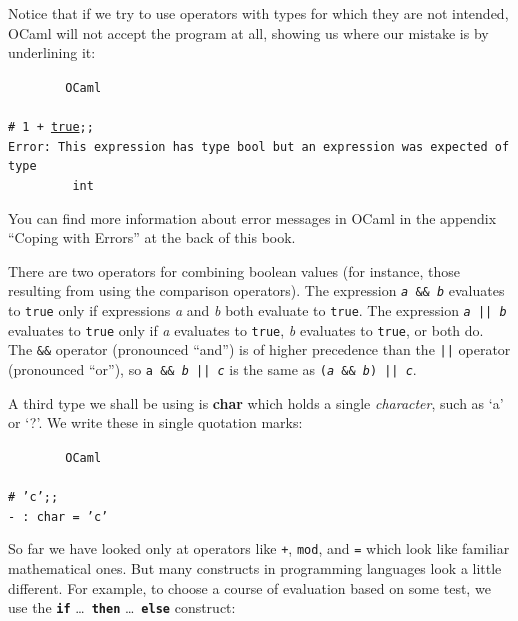 \documentclass[]{book}
\newcommand{\smspace}{\vspace{4mm}}
\begin{document}
\noindent Notice that if we try to use operators with types for which they are not intended, OCaml will not accept the program at all, showing us where our mistake is by underlining it:

\smspace
\noindent\verb!        OCaml!\\
\noindent\\
\noindent\texttt{\# 1 + }\underline{\verb!true!}\texttt{;;}\\
\noindent\texttt{Error:\ This expression has type bool but an expression was expected of type}\\
\noindent\verb!         int!
\smspace

\noindent You can find more information about error messages in OCaml in the appendix ``Coping with Errors'' at the back of this book.

\newcommand{\doublebar}{||}

There are two operators for combining boolean values (for instance, those resulting from using the comparison operators). The expression \texttt{\textit{\textrm{a}} \&\& \textit{\textrm{b}}} evaluates to \texttt{true} only if expressions \textit{a} and \textit{b} both evaluate to \texttt{true}. The expression \index{\doublebar@\texttt{\doublebar}}\texttt{\textit{\textrm{a}} || \textit{\textrm{b}}} evaluates to \texttt{true} only if \textit{a} evaluates to \texttt{true}, \textit{b} evaluates to \texttt{true}, or both do. The \texttt{\&\&} operator  (pronounced ``and'') is of higher precedence than the \texttt{||} operator (pronounced ``or''), so \texttt{\textrm{\textup{a}} \&\& \textit{\textrm{b}} || \textrm{\textit{c}}} is the same as \texttt{(\textit{\textrm{a}} \&\& \textit{\textrm{b}}) || \textrm{\textit{c}}}.

A third type we shall be using is \textbf{\textsf{char}} which holds a single \textit{character}, such as `a' or `?'. We write these in single quotation marks:

\smspace
\noindent\verb!        OCaml!\\
\noindent\\
\noindent\texttt{\# 'c';;}\\
\noindent\texttt{- :\ char = 'c'}
\smspace

\noindent So far we have looked only at operators like \texttt{+}, \texttt{mod}, and \texttt{=} which look like familiar mathematical ones. But many constructs in programming languages look a little different. For example, to choose a course of evaluation based on some test, we use the \textbf{\texttt{if}} \ldots\ \textbf{\texttt{then}} \ldots\  \textbf{\texttt{else}} construct:
\end{document}
